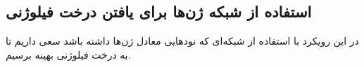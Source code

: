 %
%	
\subsection{استفاده از شبکه ژن‌ها برای یافتن درخت فیلوژنی}
در این رویکرد با استفاده از شبکه‌ای که نود‌هایی معادل ژن‌ها داشته باشد سعی داریم تا به درخت فیلوژنی بهینه برسیم.

%	

